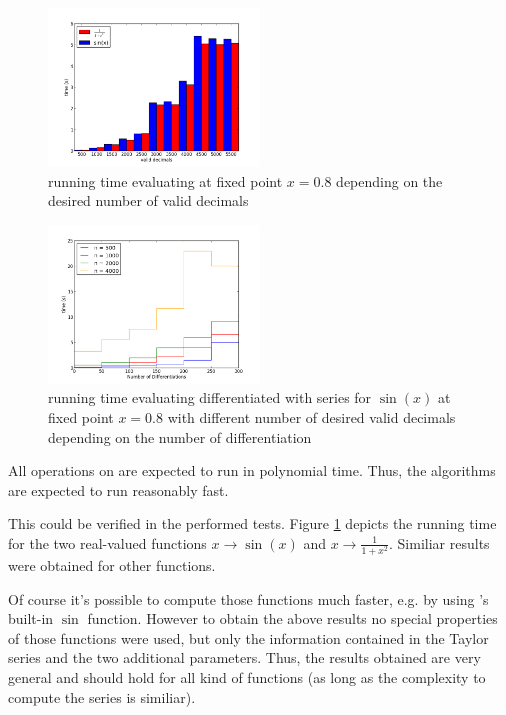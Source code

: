 			\begin{figure}[h]
				\centering
				\includegraphics[width=0.5\textwidth]{img/analytic/ba_ana_dep_on_n_bar.png}
				\caption{running time evaluating \baana at fixed point $x=0.8$ depending on the desired number of valid decimals}
				\label{fig:ba_ana dep on n}
			\end{figure}
			\begin{figure}[h]
				\centering
				\includegraphics[width=0.5\textwidth]{img/analytic/ba_ana_dep_on_diff_sin.png}
				\caption{running time evaluating differentiated \baana with series for $\sin(x)$ at fixed point $x=0.8$ with different number
        of desired valid decimals depending on the number of differentiation}
				\label{fig:ba_ana dep on differentiation}
			\end{figure}
      All operations on \baana are expected to run in polynomial time.
      Thus, the algorithms are expected to run reasonably fast.

      This could be verified in the performed tests. 
      Figure \ref{fig:ba_ana dep on n} depicts the running time for the two real-valued functions $x \to \sin(x)$ and $x \to \frac{1}{1+x^2}$.
      Similiar results were obtained for other functions.

      Of course it's possible to compute those functions much faster, e.g. by using {\irram}'s built-in $\sin$ function.
      However to obtain the above results no special properties of those functions were used, but only the information 
      contained in the Taylor series and the two additional parameters.
      Thus, the results obtained are very general and should hold for all kind of functions (as long as the complexity to compute
      the series is similiar).

